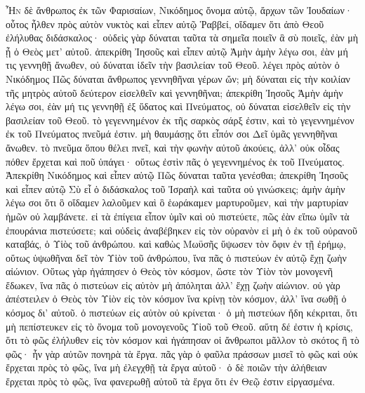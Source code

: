 \begin{pages}
    \begin{Rightside}
        \beginnumbering
		\renewcommand{\LettrineFontHook}{\PHtitl}
		\lettrine[lines=3]{Ἦ}{ν} δὲ ἄνθρωπος ἐκ τῶν Φαρισαίων, Νικόδημος ὄνομα αὐτῷ, ἄρχων τῶν Ἰουδαίων· οὗτος ἦλθεν πρὸς αὐτὸν νυκτὸς καὶ εἶπεν αὐτῷ Ῥαββεί, οἴδαμεν ὅτι ἀπὸ Θεοῦ ἐλήλυθας διδάσκαλος· οὐδεὶς γὰρ δύναται ταῦτα τὰ σημεῖα ποιεῖν ἃ σὺ ποιεῖς, ἐὰν μὴ ᾖ ὁ Θεὸς μετ’ αὐτοῦ. ἀπεκρίθη Ἰησοῦς καὶ εἶπεν αὐτῷ Ἀμὴν ἀμὴν λέγω σοι, ἐὰν μή τις γεννηθῇ ἄνωθεν, οὐ δύναται ἰδεῖν τὴν βασιλείαν τοῦ Θεοῦ. λέγει πρὸς αὐτὸν ὁ Νικόδημος Πῶς δύναται ἄνθρωπος γεννηθῆναι γέρων ὤν; μὴ δύναται εἰς τὴν κοιλίαν τῆς μητρὸς αὐτοῦ δεύτερον εἰσελθεῖν καὶ γεννηθῆναι; ἀπεκρίθη Ἰησοῦς Ἀμὴν ἀμὴν λέγω σοι, ἐὰν μή τις γεννηθῇ ἐξ ὕδατος καὶ Πνεύματος, οὐ δύναται εἰσελθεῖν εἰς τὴν βασιλείαν τοῦ Θεοῦ. τὸ γεγεννημένον ἐκ τῆς σαρκὸς σάρξ ἐστιν, καὶ τὸ γεγεννημένον ἐκ τοῦ Πνεύματος πνεῦμά ἐστιν. μὴ θαυμάσῃς ὅτι εἶπόν σοι Δεῖ ὑμᾶς γεννηθῆναι ἄνωθεν. τὸ πνεῦμα ὅπου θέλει πνεῖ, καὶ τὴν φωνὴν αὐτοῦ ἀκούεις, ἀλλ’ οὐκ οἶδας πόθεν ἔρχεται καὶ ποῦ ὑπάγει· οὕτως ἐστὶν πᾶς ὁ γεγεννημένος ἐκ τοῦ Πνεύματος. 
		\pend
		\pstart
		Ἀπεκρίθη Νικόδημος καὶ εἶπεν αὐτῷ Πῶς δύναται ταῦτα γενέσθαι; ἀπεκρίθη Ἰησοῦς καὶ εἶπεν αὐτῷ Σὺ εἶ ὁ διδάσκαλος τοῦ Ἰσραὴλ καὶ ταῦτα οὐ γινώσκεις; ἀμὴν ἀμὴν λέγω σοι ὅτι ὃ οἴδαμεν λαλοῦμεν καὶ ὃ ἑωράκαμεν μαρτυροῦμεν, καὶ τὴν μαρτυρίαν ἡμῶν οὐ λαμβάνετε. εἰ τὰ ἐπίγεια εἶπον ὑμῖν καὶ οὐ πιστεύετε, πῶς ἐὰν εἴπω ὑμῖν τὰ ἐπουράνια πιστεύσετε; καὶ οὐδεὶς ἀναβέβηκεν εἰς τὸν οὐρανὸν εἰ μὴ ὁ ἐκ τοῦ οὐρανοῦ καταβάς, ὁ Υἱὸς τοῦ ἀνθρώπου. καὶ καθὼς Μωϋσῆς ὕψωσεν τὸν ὄφιν ἐν τῇ ἐρήμῳ, οὕτως ὑψωθῆναι δεῖ τὸν Υἱὸν τοῦ ἀνθρώπου, ἵνα πᾶς ὁ πιστεύων ἐν αὐτῷ ἔχῃ ζωὴν αἰώνιον. 
		\pend
		\pstart
		Οὕτως γὰρ ἠγάπησεν ὁ Θεὸς τὸν κόσμον, ὥστε τὸν Υἱὸν τὸν μονογενῆ ἔδωκεν, ἵνα πᾶς ὁ πιστεύων εἰς αὐτὸν μὴ ἀπόληται ἀλλ’ ἔχῃ ζωὴν αἰώνιον. οὐ γὰρ ἀπέστειλεν ὁ Θεὸς τὸν Υἱὸν εἰς τὸν κόσμον ἵνα κρίνῃ τὸν κόσμον, ἀλλ’ ἵνα σωθῇ ὁ κόσμος δι’ αὐτοῦ. ὁ πιστεύων εἰς αὐτὸν οὐ κρίνεται· ὁ μὴ πιστεύων ἤδη κέκριται, ὅτι μὴ πεπίστευκεν εἰς τὸ ὄνομα τοῦ μονογενοῦς Υἱοῦ τοῦ Θεοῦ. αὕτη δέ ἐστιν ἡ κρίσις, ὅτι τὸ φῶς ἐλήλυθεν εἰς τὸν κόσμον καὶ ἠγάπησαν οἱ ἄνθρωποι μᾶλλον τὸ σκότος ἢ τὸ φῶς· ἦν γὰρ αὐτῶν πονηρὰ τὰ ἔργα. πᾶς γὰρ ὁ φαῦλα πράσσων μισεῖ τὸ φῶς καὶ οὐκ ἔρχεται πρὸς τὸ φῶς, ἵνα μὴ ἐλεγχθῇ τὰ ἔργα αὐτοῦ· ὁ δὲ ποιῶν τὴν ἀλήθειαν ἔρχεται πρὸς τὸ φῶς, ἵνα φανερωθῇ αὐτοῦ τὰ ἔργα ὅτι ἐν Θεῷ ἐστιν εἰργασμένα. 

\end{Rightside}
\end{pages}
